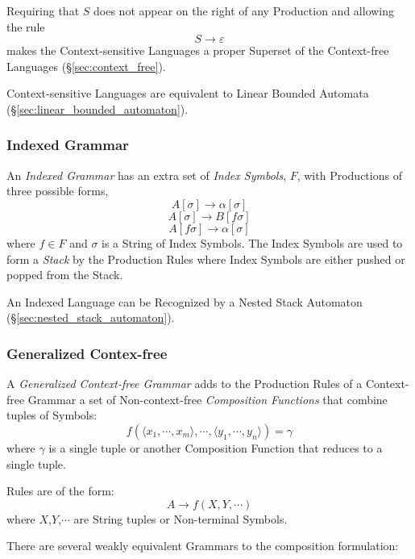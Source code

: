 Requiring that $S$ does not appear on the right of any Production
and allowing the rule
\[
  S \rightarrow \varepsilon
\]
makes the Context-sensitive Languages a proper Superset of the
Context-free Languages (\S\ref{sec:context_free}).

Context-sensitive Languages are equivalent to Linear Bounded Automata
(\S\ref{sec:linear_bounded_automaton}).



\subsubsection{Indexed Grammar}\label{subsubsection:indexed_grammar}

An \emph{Indexed Grammar} has an extra set of \emph{Index Symbols},
$F$, with Productions of three possible forms,
\[
  A[\sigma] \rightarrow \alpha[\sigma]
\]\[
  A[\sigma] \rightarrow B[f\sigma]
\]\[
  A[f\sigma] \rightarrow \alpha[\sigma]
\]
where $f \in F$ and $\sigma$ is a String of Index Symbols. The Index
Symbols are used to form a \emph{Stack} by the Production Rules where
Index Symbols are either pushed or popped from the Stack.

An Indexed Language can be Recognized by a Nested Stack Automaton
(\S\ref{sec:nested_stack_automaton}).\cite{aho69}



\subsubsection{Generalized Contex-free}\label{sec:generalized_context_free}

A \emph{Generalized Context-free Grammar} adds to the Production Rules
of a Context-free Grammar a set of Non-context-free \emph{Composition
  Functions} that combine tuples of Symbols:
\[
  f(\langle x_1,\cdots,x_m\rangle,\cdots,\langle
  y_1,\cdots,y_n\rangle)=\gamma
\]
where $\gamma$ is a single tuple or another Composition Function that
reduces to a single tuple.

Rules are of the form:
\[
  A \rightarrow f(X,Y,\cdots)
\]
where $X$,$Y$,$\cdots$ are String tuples or Non-terminal Symbols.

There are several weakly equivalent Grammars to the composition
formulation:

